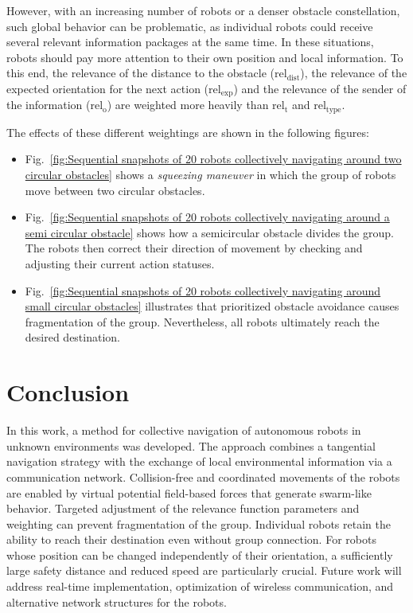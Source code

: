 \documentclass[conference]{IEEEtran}
\begin{document}
However, with an increasing number of robots or a denser obstacle constellation, 
such global behavior can be problematic, as individual 
robots could receive several relevant information packages at the same time. 
In these situations, robots should pay more attention to their own position and local 
information. To this end, the relevance of the distance to the obstacle 
($\mathrm{rel}_{\mathrm{dist}}$), the relevance of the expected orientation for the next action 
($\mathrm{rel}_{\mathrm{exp}}$) and the relevance of the sender of the information ($\mathrm{rel}_{\mathrm{o}}$) 
are weighted more heavily than $\mathrm{rel}_{\mathrm{t}}$ and $\mathrm{rel}_{\mathrm{type}}$.

The effects of these different weightings are shown in the following figures:
\begin{itemize}
\item Fig.~\ref{fig:Sequential snapshots of 20 robots collectively navigating around two 
circular obstacles} 
shows a \textit{squeezing maneuver} in which the 
group of robots move between two circular obstacles.
\item Fig.~\ref{fig:Sequential snapshots of 20 robots collectively navigating around a 
semi circular obstacle} 
shows how a semicircular obstacle 
divides the group. The robots then correct their direction of movement 
by checking and adjusting their current action statuses.
\item Fig.~\ref{fig:Sequential snapshots of 20 robots collectively navigating around 
small circular obstacles} illustrates that prioritized 
obstacle avoidance causes fragmentation of the group. 
Nevertheless, all robots ultimately reach the desired destination.
\end{itemize}


\section{Conclusion}
In this work, a method for collective navigation of autonomous robots in unknown environments 
was developed. The approach combines a tangential navigation strategy with the exchange of local 
environmental information via a communication network. Collision-free and coordinated movements 
of the robots are enabled by virtual potential field-based forces that generate swarm-like behavior. 
Targeted adjustment of the relevance function parameters and weighting can prevent fragmentation 
of the group. Individual robots retain the ability to reach their destination even without 
group connection. For robots whose position can be changed independently of their orientation, a sufficiently large safety distance and reduced speed are particularly crucial. 
Future work will address real-time implementation, optimization of wireless communication, 
and alternative network structures for the robots.
\end{document}
